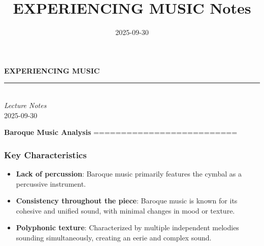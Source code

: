 \documentclass[11pt,letterpaper]{article}
\title{\textcolor{primarycolor}{\Huge\textbf{EXPERIENCING MUSIC Notes}}}
\author{}
\date{\textcolor{secondarycolor}{2025-09-30}}
\begin{document}
\begin{tcolorbox}[
    enhanced,
    colback=backgroundcolor,
    colframe=primarycolor,
    boxrule=2pt,
    arc=8pt,
    width=\textwidth,
    left=0pt,
    right=0pt,
    top=0pt,
    bottom=0pt
]
    \begin{center}
        \vspace{1.2cm}
        {\fontsize{32}{38}\selectfont\textcolor{primarycolor}{\textbf{EXPERIENCING MUSIC}}} \\[0.8cm]

        {\color{secondarycolor}\rule{0.6\textwidth}{1.5pt}} \\[0.5cm]

        {\Large\textcolor{secondarycolor!80}{\textit{Lecture Notes}}} \\[0.4cm]

        {\large\textcolor{accentcolor}{\textbullet\hspace{0.3em}2025-09-30\hspace{0.3em}\textbullet}} \\[0.3cm]

        \vspace{1cm}
    \end{center}
\end{tcolorbox}

\vspace{1.5cm}

\textbf{Baroque Music Analysis}
==========================

\subsubsection*{Key Characteristics}

\begin{itemize}
  \item \textbf{Lack of percussion}: Baroque music primarily features the cymbal as a percussive instrument.
  \item \textbf{Consistency throughout the piece}: Baroque music is known for its cohesive and unified sound, with minimal changes in mood or texture.
  \item \textbf{Polyphonic texture}: Characterized by multiple independent melodies sounding simultaneously, creating an eerie and complex sound.
\end{itemize}
\end{document}
